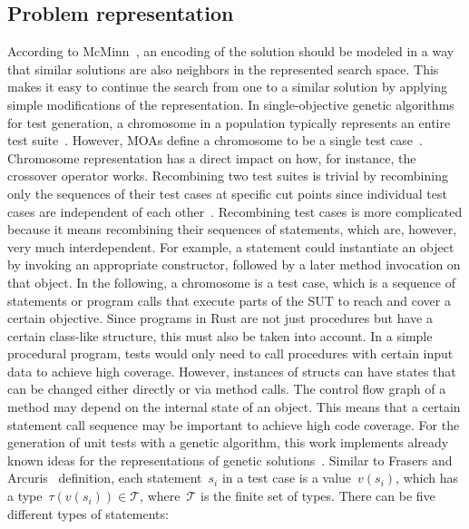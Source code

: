 \documentclass[paper=a4,%
  twoside,%
  BCOR4mm,%
  abstract=true,%
  toc=bibliography,%
  chapterprefix=true,%
  toc=bibliographynumbered,%
  open=right,%
  english,%
  pagesize=pdftex]{scrreprt}
\begin{document}
\subsection{Problem representation}
\label{sec:problem-representation}
According to McMinn~\cite{McMinn_2004}, an encoding of the solution should be modeled in a way that similar solutions are also neighbors in the represented search space. This makes it easy to continue the search from one to a similar solution by applying simple modifications of the representation. In single-objective genetic algorithms for test generation, a chromosome in a population typically represents an entire test suite~\cite{Fraser_2011a, Campos2017}. However, \acp{MOA} define a chromosome to be a single test case~\cite{Panichella2018}. Chromosome representation has a direct impact on how, for instance, the crossover operator works. Recombining two test suites is trivial by recombining only the sequences of their test cases at specific cut points since individual test cases are independent of each other~\cite{Fraser_2013}. Recombining test cases is more complicated because it means recombining their sequences of statements, which are, however, very much interdependent. For example, a statement could instantiate an object by invoking an appropriate constructor, followed by a later method invocation on that object. In the following, a chromosome is a test case, which is a sequence of statements or program calls that execute parts of the \ac{SUT} to reach and cover a certain objective. Since programs in Rust are not just procedures but have a certain class-like structure, this must also be taken into account. In a simple procedural program, tests would only need to call procedures with certain input data to achieve high coverage. However, instances of structs can have states that can be changed either directly or via method calls. The control flow graph of a method may depend on the internal state of an object. This means that a certain statement call sequence may be important to achieve high code coverage. For the generation of unit tests with a genetic algorithm, this work implements already known ideas for the representations of genetic solutions~\cite{Fraser2012,Tonella2004,Arcuri2008}. Similar to Frasers and Arcuris~\cite{Fraser_2011a} definition, each statement~$s_i$ in a test case is a value~$v(s_i)$, which has a type~$\tau(v(s_i)) \in \mathcal{T}$, where~$\mathcal{T}$ is the finite set of types. There can be five different types of statements:
\end{document}
